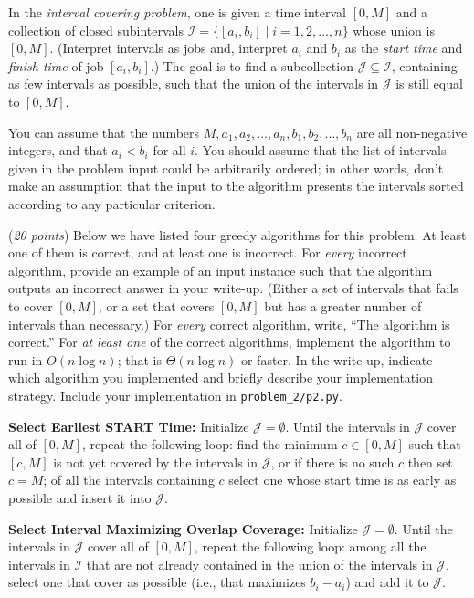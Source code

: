 \documentclass{hw}
\begin{document}
\begin{problem}
In the {\em interval covering problem},
one is given a time interval $[0,M]$
and a collection of closed subintervals
$\mathcal{I} = \{[a_i,b_i] \mid i=1,2,\ldots,n\}$
whose union is $[0,M]$. (Interpret intervals as jobs
and, interpret $a_i$ and $b_i$ as the {\em start time}
and {\em finish time} of job $[a_i,b_i]$.)
The goal is to find a subcollection
$\mathcal{J} \subseteq \mathcal{I}$, containing
as few intervals as possible, such that
the union of the intervals in $\mathcal{J}$
is still equal to $[0,M]$.

You can assume that the
numbers $M,a_1,a_2,\ldots,a_n,b_1,b_2,\ldots,b_n$
are all non-negative integers, and that
$a_i < b_i$ for all $i$. You should assume
that the list of intervals given in the
problem input could be arbitrarily ordered;
in other words, don't make an assumption that
the input to the algorithm presents the intervals
sorted according to any particular criterion.

(\textit{20 points}) Below we have listed four greedy algorithms for
this problem. At least one of them is correct,
and at least one is incorrect. For {\em every} incorrect
algorithm, provide an example of an input instance
such that the algorithm outputs an incorrect answer
in your write-up.
(Either a set of intervals that fails to cover $[0,M]$,
or a set that covers $[0,M]$ but has a greater number
of intervals than necessary.) For {\em every} correct
algorithm, write, ``The algorithm is correct.''
For {\em at least one} of the correct algorithms,
implement the algorithm to run in $O(n \log n)$; that is 
$\Theta(n \log n)$ or faster.
In the write-up, indicate which algorithm you implemented
and briefly describe your implementation strategy. Include your implementation in \texttt{problem\_2/p2.py}.

  \begin{subproblem}
    \textbf{Select Earliest START Time:}
  Initialize $\mathcal{J}=\emptyset$.
  Until the intervals in $\mathcal{J}$ cover all of $[0,M]$,
  repeat the following loop: find the minimum $c \in [0,M]$
  such that $[c,M]$ is not yet covered by the intervals in $\mathcal{J}$,
  or if there is no such $c$ then set $c=M$; of all the intervals
  containing $c$ select one whose start time is as early as 
  possible and insert it into $\mathcal{J}$.
  \end{subproblem}

  \begin{subproblem}
    \textbf{Select Interval Maximizing Overlap Coverage:}
  Initialize $\mathcal{J}=\emptyset$.
  Until the intervals in $\mathcal{J}$ cover all of $[0,M]$,
  repeat the following loop: among all the intervals in
  $\mathcal{I}$ that are not already contained in the union
  of the intervals in $\mathcal{J}$, select one that cover as possible (i.e., that maximizes $b_i-a_i$) and
  add it to $\mathcal{J}$.
  \end{subproblem}


\end{problem}
\end{document}
